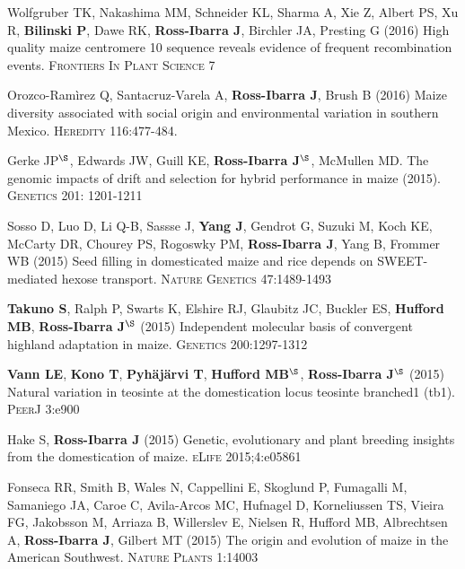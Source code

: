 \documentclass[letterpaper,10pt]{article}
\begin{document}
\begin{etaremune}
\item Wolfgruber TK, Nakashima MM, Schneider KL, Sharma A, Xie Z, Albert PS, Xu R, {\bf Bilinski P},  Dawe RK, {\bf Ross-Ibarra J}, Birchler JA, Presting G (2016) High quality maize centromere 10 sequence reveals evidence of frequent recombination events. \textsc{Frontiers In Plant Science} 7

\item Orozco-Ram\`{i}rez Q, Santacruz-Varela A, {\bf Ross-Ibarra J}, Brush B (2016) Maize diversity associated with social origin and environmental variation in southern Mexico. \textsc{Heredity} 116:477-484.


\item Gerke JP$^\S$, Edwards JW, Guill KE, {\bf Ross-Ibarra J}$^\S$, McMullen MD.  The genomic impacts of drift and selection for hybrid performance in maize (2015). \textsc{Genetics}  201: 1201-1211


\item Sosso D, Luo D, Li Q-B, Sassse J, {\bf Yang J}, Gendrot G, Suzuki M, Koch KE, McCarty DR, Chourey PS, Rogoswky PM, {\bf Ross-Ibarra J}, Yang B, Frommer WB (2015) Seed filling in domesticated maize and rice depends on SWEET-mediated hexose transport. \textsc{Nature Genetics} 47:1489-1493


\item {\bf Takuno S}, Ralph P, Swarts K, Elshire RJ, Glaubitz JC, Buckler ES, {\bf Hufford MB}, {\bf Ross-Ibarra J}$^\S$ (2015) Independent molecular basis of convergent highland adaptation in maize. \textsc{Genetics} 200:1297-1312


\item {\bf Vann LE}, {\bf Kono T}, {\bf Pyh\"aj\"arvi T}, {\bf Hufford MB}$^\S$, {\bf Ross-Ibarra J}$^\S$ (2015) Natural variation in teosinte at the domestication locus teosinte branched1 (tb1). \textsc{PeerJ} 3:e900


\item Hake S, {\bf Ross-Ibarra J} (2015) Genetic, evolutionary and plant breeding insights from the domestication of maize. \textsc{eLife}  2015;4:e05861


\item Fonseca RR, Smith B, Wales N, Cappellini E, Skoglund P, Fumagalli M, Samaniego JA, Caroe C, Avila-Arcos MC, Hufnagel D, Korneliussen TS, Vieira FG, Jakobsson M, Arriaza B, Willerslev E, Nielsen R, Hufford MB, Albrechtsen A,  {\bf Ross-Ibarra J}, Gilbert MT (2015) The origin and evolution of maize in the American Southwest. \textsc{Nature Plants} 1:14003


\end{etaremune}
\end{document}
